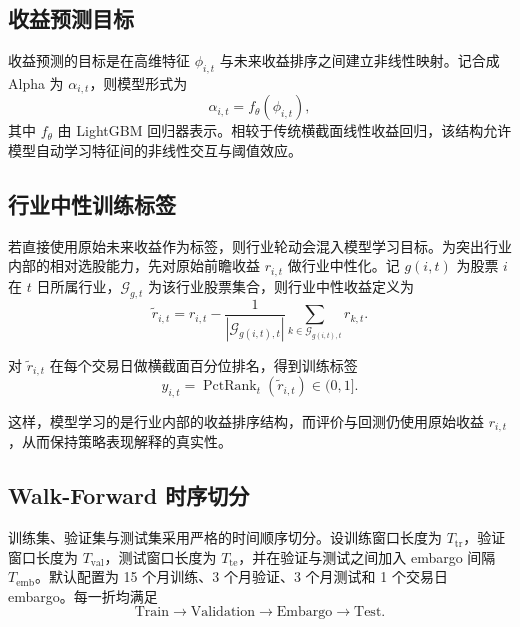 \documentclass[12pt, a4paper, oneside]{article}
\begin{document}
\subsection{收益预测目标}

收益预测的目标是在高维特征 \(\phi_{i,t}\) 与未来收益排序之间建立非线性映射。记合成 Alpha 为 \(\alpha_{i,t}\)，则模型形式为
\begin{equation}
\alpha_{i,t} = f_\theta(\phi_{i,t}),
\end{equation}
其中 \(f_\theta\) 由 LightGBM 回归器表示。相较于传统横截面线性收益回归，该结构允许模型自动学习特征间的非线性交互与阈值效应。

\subsection{行业中性训练标签}

若直接使用原始未来收益作为标签，则行业轮动会混入模型学习目标。为突出行业内部的相对选股能力，先对原始前瞻收益 \(r_{i,t}\) 做行业中性化。记 \(g(i,t)\) 为股票 \(i\) 在 \(t\) 日所属行业，\(\mathcal G_{g,t}\) 为该行业股票集合，则行业中性收益定义为
\begin{equation}
\tilde r_{i,t} = r_{i,t} - \frac{1}{|\mathcal G_{g(i,t),t}|}\sum_{k\in\mathcal G_{g(i,t),t}} r_{k,t}.
\end{equation}

对 \(\tilde r_{i,t}\) 在每个交易日做横截面百分位排名，得到训练标签
\begin{equation}
y_{i,t} = \operatorname{PctRank}_t(\tilde r_{i,t}) \in (0,1].
\end{equation}

这样，模型学习的是行业内部的收益排序结构，而评价与回测仍使用原始收益 \(r_{i,t}\)，从而保持策略表现解释的真实性。

\subsection{Walk-Forward 时序切分}

训练集、验证集与测试集采用严格的时间顺序切分。设训练窗口长度为 \(T_{\mathrm{tr}}\)，验证窗口长度为 \(T_{\mathrm{val}}\)，测试窗口长度为 \(T_{\mathrm{te}}\)，并在验证与测试之间加入 embargo 间隔 \(T_{\mathrm{emb}}\)。默认配置为 15 个月训练、3 个月验证、3 个月测试和 1 个交易日 embargo。每一折均满足
\begin{equation}
\mathrm{Train} \rightarrow \mathrm{Validation} \rightarrow \mathrm{Embargo} \rightarrow \mathrm{Test}.
\end{equation}
\end{document}
